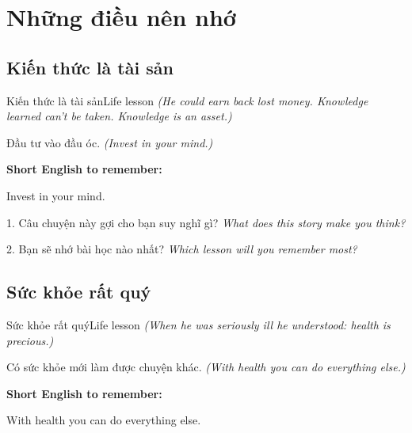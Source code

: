 \chapter{Những điều nên nhớ}


\section{Kiến thức là tài sản}
\begin{truyen}{Kiến thức là tài sản}{Life lesson}
\textit{(He could earn back lost money. Knowledge learned can't be taken. Knowledge is an asset.)}
\end{truyen}

\begin{baihoc}
Đầu tư vào đầu óc.
\textit{(Invest in your mind.)}
\end{baihoc}

\begin{ghinhoanh}
\textbf{Short English to remember:}

Invest in your mind.

\end{ghinhoanh}

\begin{tuhocnhanh}
1. Câu chuyện này gợi cho bạn suy nghĩ gì? \textit{What does this story make you think?}

2. Bạn sẽ nhớ bài học nào nhất? \textit{Which lesson will you remember most?}
\end{tuhocnhanh}
\ngancach


\section{Sức khỏe rất quý}
\begin{truyen}{Sức khỏe rất quý}{Life lesson}
\textit{(When he was seriously ill he understood: health is precious.)}
\end{truyen}

\begin{baihoc}
Có sức khỏe mới làm được chuyện khác.
\textit{(With health you can do everything else.)}
\end{baihoc}

\begin{ghinhoanh}
\textbf{Short English to remember:}

With health you can do everything else.

\end{ghinhoanh}

